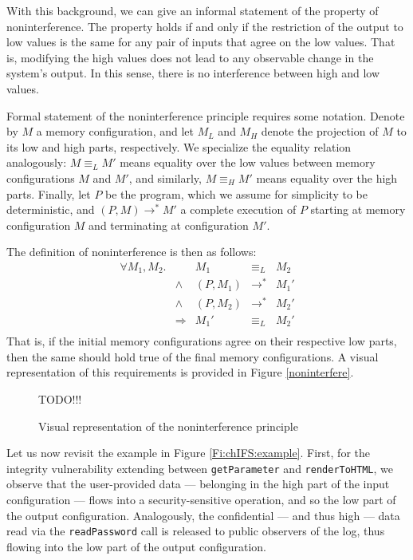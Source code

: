 With this background, we can give an informal statement of the property of noninterference. The property holds if and only if the restriction of the output to low values is the same for any pair of inputs that agree on the low values. That is, modifying the high values does not lead to any observable change in the system's output. In this sense, there is no interference between high and low values.

Formal statement of the noninterference principle requires some notation. Denote by $M$ a memory configuration, and let $M_L$ and $M_H$ denote the projection of $M$ to its low and high parts, respectively. We specialize the equality relation analogously: $M \equiv_{L} M'$ means equality over the low values between memory configurations $M$ and $M'$, and similarly, $M \equiv_{H} M'$ means equality over the high parts. Finally, let $P$ be the program, which we assume for simplicity to be deterministic, and $(P,M) \longrightarrow^{*} M'$ a complete execution of $P$ starting at memory configuration $M$ and terminating at configuration $M'$.

The definition of noninterference is then as follows:
$$
	\begin{array}{rrrcl}
	\forall M_1,M_2. &  				  & M_1 & \equiv_L & M_2 \\
							   &  \wedge & (P,M_1) & \longrightarrow^{*} & M_1' \\ 
							   &  \wedge & (P,M_2) & \longrightarrow^{*} & M_2' \\
						   & \Longrightarrow & M_1'    & \equiv_L & M_2'  \\
	\end{array}
$$
That is, if the initial memory configurations agree on their respective low parts, then the same should hold true of the final memory configurations. A visual representation of this requirements is provided in Figure \ref{noninterfere}. 

\begin{figure}
	TODO!!!
	\caption{Visual representation of the noninterference principle}
\end{figure}

Let us now revisit the example in Figure \ref{Fi:chIFS:example}. First, for the integrity vulnerability extending between {\tt getParameter} and {\tt renderToHTML}, we observe that 
the user-provided data --- belonging in the high part of the input configuration --- flows into a security-sensitive operation, and so the low part of the output configuration. Analogously, the confidential --- and thus high --- data read via the {\tt readPassword} call is released to public observers of the log, thus flowing into the low part of the output configuration.

